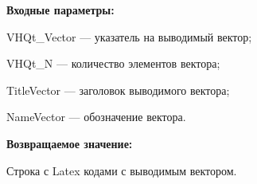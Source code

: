 \textbf{Входные параметры:}
 
VHQt\_Vector --- указатель на выводимый вектор;
 
VHQt\_N --- количество элементов вектора;
 
TitleVector --- заголовок выводимого вектора;
 
NameVector --- обозначение вектора.
	
\textbf{Возвращаемое значение:}

Строка с Latex кодами с выводимым вектором.